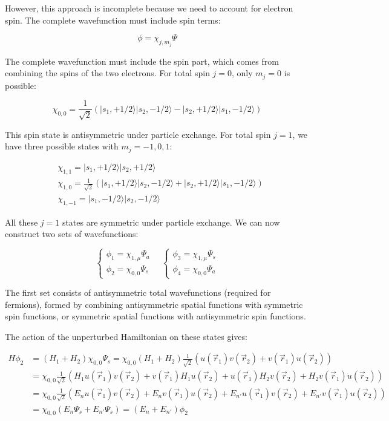 However, this approach is incomplete because we need to account for electron spin. The complete wavefunction must include spin terms:

\begin{equation}
\phi=\chi_{j,m_j}\Psi
\end{equation}


The complete wavefunction must include the spin part, which comes from combining the spins of the two electrons. For total spin $j=0$, only $m_j=0$ is possible:

\begin{equation}
\chi_{0,0}=\frac{1}{\sqrt{2}}(|s_1,+1/2\rangle|s_2,-1/2\rangle-|s_2,+1/2\rangle|s_1,-1/2\rangle)
\end{equation}

This spin state is antisymmetric under particle exchange. For total spin $j=1$, we have three possible states with $m_j=-1,0,1$:

\begin{align}
&\chi_{1,1}=|s_1,+1/2\rangle|s_2,+1/2\rangle\\
&\chi_{1,0}=\frac{1}{\sqrt{2}}(|s_1,+1/2\rangle|s_2,-1/2\rangle+|s_2,+1/2\rangle|s_1,-1/2\rangle) \\
&\chi_{1,-1}=|s_1,-1/2\rangle|s_2,-1/2\rangle
\end{align}

All these $j=1$ states are symmetric under particle exchange. We can now construct two sets of wavefunctions:

\[
\left\{\begin{array}{l}
\phi_1=\chi_{1,\mu}\Psi_a \\
\phi_2=\chi_{0,0}\Psi_s
\end{array}\right.
\quad
\left\{\begin{array}{l}
\phi_3=\chi_{1,\mu}\Psi_s\\
\phi_4=\chi_{0,0}\Psi_a
\end{array}\right.
\]

The first set consists of antisymmetric total wavefunctions (required for fermions), formed by combining antisymmetric spatial functions with symmetric spin functions, or symmetric spatial functions with antisymmetric spin functions.

The action of the unperturbed Hamiltonian on these states gives:

\begin{align}
H\phi_2&=(H_1+H_2)\chi_{0,0}\Psi_s=\chi_{0,0}(H_1+H_2)\frac{1}{\sqrt{2}}(u(\vec{r}_1)v(\vec{r}_2)+v(\vec{r}_1)u(\vec{r}_2))\\
&=\chi_{0,0}\frac{1}{\sqrt{2}}(H_1u(\vec{r}_1)v(\vec{r}_2)+v(\vec{r}_1)H_1u(\vec{r}_2)+u(\vec{r}_1)H_2v(\vec{r}_2)+H_2v(\vec{r}_1)u(\vec{r}_2))\\
&=\chi_{0,0}\frac{1}{\sqrt{2}}(E_nu(\vec{r}_1)v(\vec{r}_2)+E_nv(\vec{r}_1)u(\vec{r}_2)+E_{n'}u(\vec{r}_1)v(\vec{r}_2)+E_{n'}v(\vec{r}_1)u(\vec{r}_2))\\
&=\chi_{0,0}(E_n\Psi_s+E_{n'}\Psi_s)=(E_n+E_{n'})\phi_2
\end{align}

